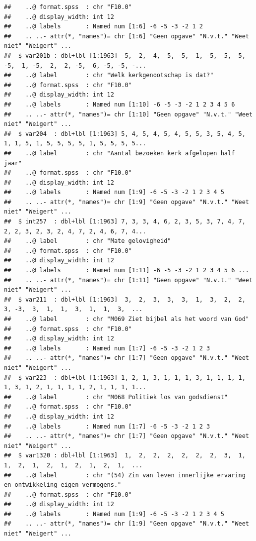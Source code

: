 \documentclass[
]{book}
\begin{document}
\begin{verbatim}
##    ..@ format.spss  : chr "F10.0"
##    ..@ display_width: int 12
##    ..@ labels       : Named num [1:6] -6 -5 -3 -2 1 2
##    .. ..- attr(*, "names")= chr [1:6] "Geen opgave" "N.v.t." "Weet niet" "Weigert" ...
##  $ var201b : dbl+lbl [1:1963] -5,  2,  4, -5, -5,  1, -5, -5, -5, -5,  1, -5,  2,  2, -5,  6, -5, -5, -...
##    ..@ label        : chr "Welk kerkgenootschap is dat?"
##    ..@ format.spss  : chr "F10.0"
##    ..@ display_width: int 12
##    ..@ labels       : Named num [1:10] -6 -5 -3 -2 1 2 3 4 5 6
##    .. ..- attr(*, "names")= chr [1:10] "Geen opgave" "N.v.t." "Weet niet" "Weigert" ...
##  $ var204  : dbl+lbl [1:1963] 5, 4, 5, 4, 5, 4, 5, 5, 3, 5, 4, 5, 1, 1, 5, 1, 5, 5, 5, 5, 1, 5, 5, 5, 5...
##    ..@ label        : chr "Aantal bezoeken kerk afgelopen half jaar"
##    ..@ format.spss  : chr "F10.0"
##    ..@ display_width: int 12
##    ..@ labels       : Named num [1:9] -6 -5 -3 -2 1 2 3 4 5
##    .. ..- attr(*, "names")= chr [1:9] "Geen opgave" "N.v.t." "Weet niet" "Weigert" ...
##  $ int257  : dbl+lbl [1:1963] 7, 3, 3, 4, 6, 2, 3, 5, 3, 7, 4, 7, 2, 2, 3, 2, 3, 2, 4, 7, 2, 4, 6, 7, 4...
##    ..@ label        : chr "Mate gelovigheid"
##    ..@ format.spss  : chr "F10.0"
##    ..@ display_width: int 12
##    ..@ labels       : Named num [1:11] -6 -5 -3 -2 1 2 3 4 5 6 ...
##    .. ..- attr(*, "names")= chr [1:11] "Geen opgave" "N.v.t." "Weet niet" "Weigert" ...
##  $ var211  : dbl+lbl [1:1963]  3,  2,  3,  3,  3,  1,  3,  2,  2,  3, -3,  3,  1,  1,  3,  1,  1,  3,  ...
##    ..@ label        : chr "M069 Ziet bijbel als het woord van God"
##    ..@ format.spss  : chr "F10.0"
##    ..@ display_width: int 12
##    ..@ labels       : Named num [1:7] -6 -5 -3 -2 1 2 3
##    .. ..- attr(*, "names")= chr [1:7] "Geen opgave" "N.v.t." "Weet niet" "Weigert" ...
##  $ var223  : dbl+lbl [1:1963] 1, 2, 1, 3, 1, 1, 1, 3, 1, 1, 1, 1, 1, 3, 1, 2, 1, 1, 1, 1, 2, 1, 1, 1, 1...
##    ..@ label        : chr "M068 Politiek los van godsdienst"
##    ..@ format.spss  : chr "F10.0"
##    ..@ display_width: int 12
##    ..@ labels       : Named num [1:7] -6 -5 -3 -2 1 2 3
##    .. ..- attr(*, "names")= chr [1:7] "Geen opgave" "N.v.t." "Weet niet" "Weigert" ...
##  $ var1320 : dbl+lbl [1:1963]  1,  2,  2,  2,  2,  2,  2,  3,  1,  1,  2,  1,  2,  1,  2,  1,  2,  1,  ...
##    ..@ label        : chr "(54) Zin van leven innerlijke ervaring en ontwikkeling eigen vermogens."
##    ..@ format.spss  : chr "F10.0"
##    ..@ display_width: int 12
##    ..@ labels       : Named num [1:9] -6 -5 -3 -2 1 2 3 4 5
##    .. ..- attr(*, "names")= chr [1:9] "Geen opgave" "N.v.t." "Weet niet" "Weigert" ...

\end{verbatim}
\end{document}
